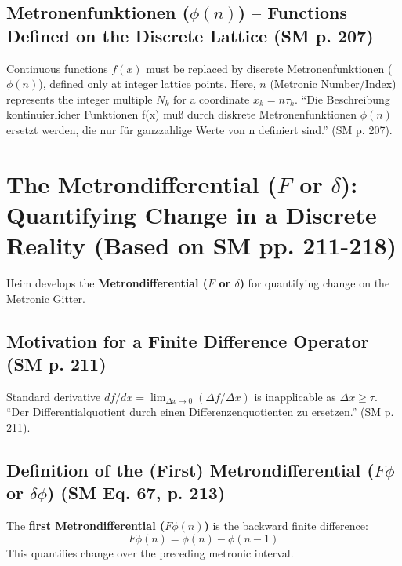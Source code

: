\documentclass[
    12pt,              %
    a4paper,           %
    headings=normal,   %
    twoside=true,      %
    BCOR=8mm,          %
]{scrbook}
\newcommand{\q}[1]{\enquote{#1}}
\newcommand{\metron}{\tau}
\newcommand{\metrondifferential}{F}
\newcommand{\metronenfunktion}{\phi(n)}
\newcommand{\metronenziffer}{n}
\begin{document}
\subsection{Metronenfunktionen (\(\metronenfunktion\)) – Functions Defined on the Discrete Lattice (SM p. 207)}
\label{sec:ch10_1_6_metronenfunktion}
Continuous functions \(f(x)\) must be replaced by discrete Metronenfunktionen (\(\metronenfunktion\)), defined only at integer lattice points. Here, \(\metronenziffer\) (Metronic Number/Index) represents the integer multiple \(N_k\) for a coordinate \(x_k = n \tau_k\). \q{Die Beschreibung kontinuierlicher Funktionen f(x) muß durch diskrete Metronenfunktionen \(\phi(n)\) ersetzt werden, die nur für ganzzahlige Werte von n definiert sind.} (SM p. 207).

\section{The Metrondifferential (\(\metrondifferential\) or \(\delta\)): Quantifying Change in a Discrete Reality (Based on SM pp. 211-218)}
\label{sec:ch10_2_metrondifferential}

Heim develops the \textbf{Metrondifferential (\(\metrondifferential\) or \(\delta\))} for quantifying change on the Metronic Gitter.

\subsection{Motivation for a Finite Difference Operator (SM p. 211)}
\label{sec:ch10_2_1_motivation_finite_diff}
Standard derivative \(df/dx = \lim_{\Delta x\to 0}(\Delta f/\Delta x)\) is inapplicable as \(\Delta x \ge \metron\). \q{Der Differentialquotient durch einen Differenzenquotienten zu ersetzen.} (SM p. 211).

\subsection{Definition of the (First) Metrondifferential (\(F\phi\) or \(\delta\phi\)) (SM Eq. 67, p. 213)}
\label{sec:ch10_2_2_def_first_metrondiff}
The \textbf{first Metrondifferential (\(F\phi(n)\))} is the backward finite difference:
\begin{equation} \label{eq:original_first_metrondifferential} %
F\phi(\metronenziffer) = \phi(\metronenziffer) - \phi(\metronenziffer-1)
\end{equation}
This quantifies change over the preceding metronic interval.
\end{document}
